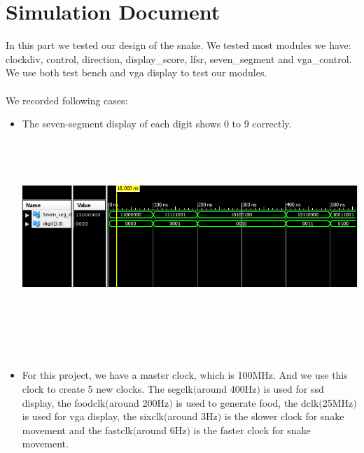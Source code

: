 \documentclass[12pt]{article}
\begin{document}
\section*{Simulation Document}
In this part we tested our design of the snake. We tested most modules we have: clockdiv, control, direction, display\_score, lfsr, seven\_segment and vga\_control. We use both test bench and vga display to test our modules.
\\
\\
We recorded following cases: 
\begin{itemize}
\item The seven-segment display of each digit shows 0 to 9 correctly.
\\
\\
\begin{minipage}{\linewidth}
            \centering
            \includegraphics[width=13.5cm, height=6.2cm]{ssd.png}
            \label{fig:figure2}
        \end{minipage}
\\
\\        
\item For this project, we have a master clock, which is 100MHz. And we use this clock to create 5 new clocks. The segclk$($around 400Hz$)$ is used for ssd display, the foodclk$($around 200Hz$)$ is used to generate food, the dclk$($25MHz$)$ is used for vga display, the sixclk$($around 3Hz$)$ is the slower clock for snake movement and the fastclk$($around 6Hz$)$ is the faster clock for snake movement.
\\
\\
\begin{minipage}{\linewidth}
            \centering

\end{minipage}
\end{itemize}
\end{document}
